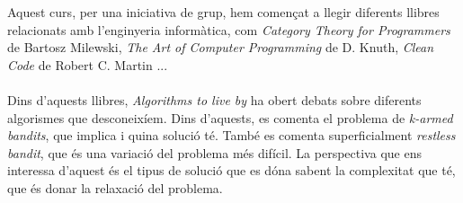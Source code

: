 
		Aquest curs, per una iniciativa de grup, hem començat a llegir diferents llibres relacionats amb l'enginyeria informàtica, com 
		\textit{Category Theory for Programmers} de Bartosz Milewski, \textit{The Art of Computer Programming}  de D. Knuth, 
		\textit{Clean Code} de Robert C. Martin \cite{catteo,knuth,clean}...\\
		\\
		Dins d'aquests llibres, \textit{Algorithms to live by} \cite{alg2liveby} %
		ha obert debats sobre diferents algorismes que desconeixíem. Dins d'aquests, es comenta el problema de
		\textit{k-armed bandits}, que implica i quina solució té. També es comenta superficialment \textit{restless bandit},
		que és una variació del problema més difícil. La perspectiva que ens interessa d'aquest és el tipus de solució
		que es dóna sabent la complexitat que té, que és donar la relaxació del problema.  %
